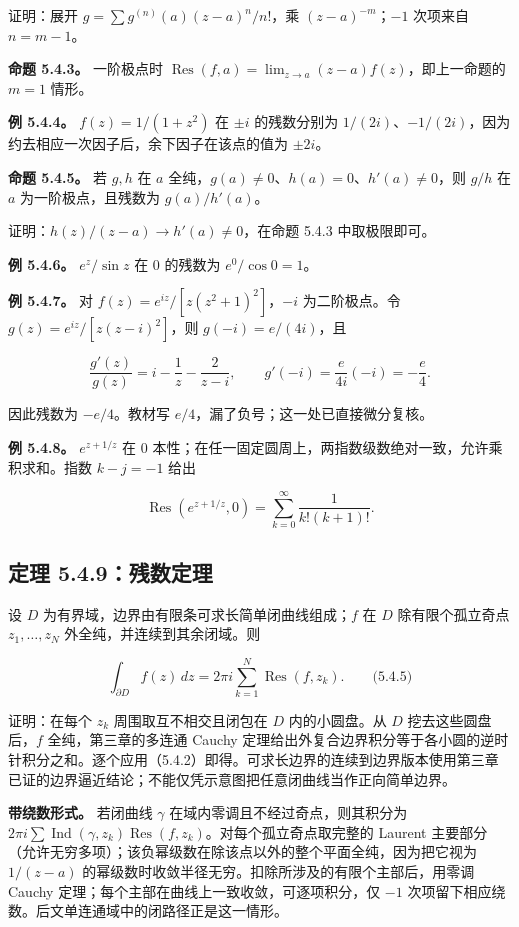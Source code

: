 \documentclass[11pt,a4paper]{article}
\begin{document}
证明：展开 \(g=\sum g^{(n)}(a)(z-a)^n/n!\)，乘 \((z-a)^{-m}\)；\(-1\)
次项来自 \(n=m-1\)。

\textbf{命题 5.4.3。} 一阶极点时
\(\operatorname{Res}(f,a)=\lim_{z\to a}(z-a)f(z)\)，即上一命题的 \(m=1\)
情形。

\textbf{例 5.4.4。} \(f(z)=1/(1+z^2)\) 在 \(\pm i\) 的残数分别为
\(1/(2i)\)、\(-1/(2i)\)，因为约去相应一次因子后，余下因子在该点的值为
\(\pm2i\)。

\textbf{命题 5.4.5。} 若 \(g,h\) 在 \(a\)
全纯，\(g(a)\ne0\)、\(h(a)=0\)、\(h'(a)\ne0\)，则 \(g/h\) 在 \(a\)
为一阶极点，且残数为 \(g(a)/h'(a)\)。

证明：\(h(z)/(z-a)\to h'(a)\ne0\)，在命题 5.4.3 中取极限即可。

\textbf{例 5.4.6。} \(e^z/\sin z\) 在 \(0\) 的残数为 \(e^0/\cos0=1\)。

\textbf{例 5.4.7。} 对 \(f(z)=e^{iz}/[z(z^2+1)^2]\)，\(-i\)
为二阶极点。令 \(g(z)=e^{iz}/[z(z-i)^2]\)，则 \(g(-i)=e/(4i)\)，且

\[
\frac{g'(z)}{g(z)}=i-\frac1z-\frac2{z-i},
\qquad g'(-i)=\frac e{4i}(-i)=-\frac e4.
\]

因此残数为 \(-e/4\)。教材写 \(e/4\)，漏了负号；这一处已直接微分复核。

\textbf{例 5.4.8。} \(e^{z+1/z}\) 在 \(0\)
本性；在任一固定圆周上，两指数级数绝对一致，允许乘积求和。指数
\(k-j=-1\) 给出

\[
\operatorname{Res}(e^{z+1/z},0)=\sum_{k=0}^{\infty}\frac1{k!(k+1)!}.
\]

\subsection{定理 5.4.9：残数定理}\label{ch05-s4-heading-3}

设 \(D\) 为有界域，边界由有限条可求长简单闭曲线组成；\(f\) 在 \(D\)
除有限个孤立奇点 \(z_1,\ldots,z_N\) 外全纯，并连续到其余闭域。则

\[
\int_{\partial D}f(z)\,dz=2\pi i\sum_{k=1}^N\operatorname{Res}(f,z_k).
\qquad\text{(5.4.5)}
\]

证明：在每个 \(z_k\) 周围取互不相交且闭包在 \(D\) 内的小圆盘。从 \(D\)
挖去这些圆盘后，\(f\) 全纯，第三章的多连通 Cauchy
定理给出外复合边界积分等于各小圆的逆时针积分之和。逐个应用（5.4.2）即得。可求长边界的连续到边界版本使用第三章已证的边界逼近结论；不能仅凭示意图把任意闭曲线当作正向简单边界。

\textbf{带绕数形式。} 若闭曲线 \(\gamma\)
在域内零调且不经过奇点，则其积分为
\(2\pi i\sum\operatorname{Ind}(\gamma,z_k)\operatorname{Res}(f,z_k)\)。对每个孤立奇点取完整的
Laurent
主要部分（允许无穷多项）；该负幂级数在除该点以外的整个平面全纯，因为把它视为
\(1/(z-a)\) 的幂级数时收敛半径无穷。扣除所涉及的有限个主部后，用零调
Cauchy 定理；每个主部在曲线上一致收敛，可逐项积分，仅 \(-1\)
次项留下相应绕数。后文单连通域中的闭路径正是这一情形。
\end{document}

